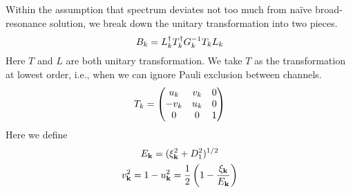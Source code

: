 Within the assumption that spectrum  deviates not too much from na\"{i}ve broad-resonance solution, we  break down the unitary transformation into two 
pieces. 
\begin{equation}
B_k=L_k^{\dagger}T_k^{\dagger}G_k^{-1}T_kL_k
\end{equation} 
Here $T$ and $L$ are both unitary transformation.  We take $T$ as the transformation at lowest order, i.e., when we can ignore Pauli exclusion between channels. 
\begin{equation}
T_k=\begin{pmatrix}u_k&v_k&0\\-v_k&u_k&0\\0&0&1\end{pmatrix}
\end{equation}
Here we define 
\begin{gather}
E_{\mathbf{k}}=(\xi_{\mathbf{k}}^{2}+D_{1}^{2})^{1/2}\\
v_{\mathbf{k}}^{2}=1-u_{\mathbf{k}}^{2}=\frac{1}{2}\left(1-\frac{\xi_{\mathbf{k}}}{E_{\mathbf{k}}}\right)
\end{gather}


